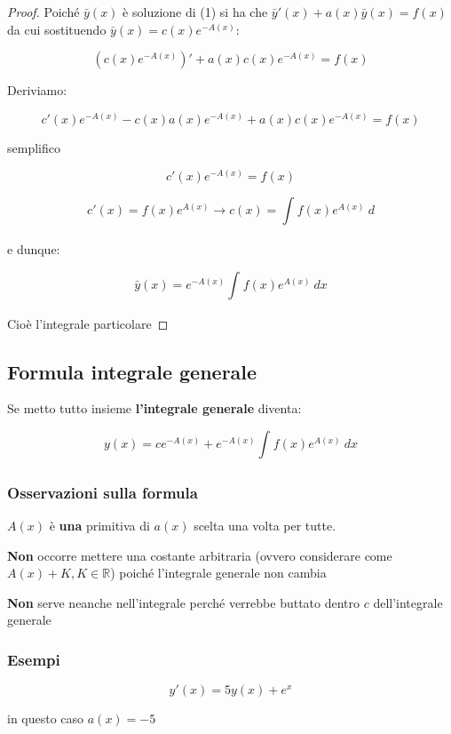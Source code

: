 \documentclass[11pt]{article}
\begin{document}
\begin{proof}
    Poiché $\bar y(x)$ è soluzione di (1) si ha che $\bar y'(x)+a(x) \bar y(x)=f(x)$ da cui sostituendo $\bar y(x) = c(x) e ^{-A(x)}$:

    \[
        (c(x) e ^{-A(x)})'+ a(x) c(x) e ^{-A(x)} = f(x)
    \]
    
    Deriviamo:

    \[
        c'(x) e ^{-A(x)} - c(x) a(x) e ^{-A(x)} + a(x) c(x) e ^{-A(x)}= f(x)
    \]
    
    semplifico

    \[
        c'(x) e ^{-A(x)} = f(x)
    \]

    \[
        c'(x) = f(x) e ^{A(x)} \rightarrow c(x) = \int_{{}}^{{}} {f(x) e ^{A(x)}} \: d{} {}
    \]

    e dunque:

    \[
        \bar y(x) = e ^{-A(x)} \int_{{}}^{{}} {f(x) e ^{A(x)}} \: d{x} {}
    \]

    Cioè l'integrale particolare
\end{proof}

\subsection{Formula integrale generale}

Se metto tutto insieme \textbf{l'integrale generale} diventa:

\[
    y(x) = c e ^{-A(x)} + e ^{-A(x)} \int_{{}}^{{}} {f(x) e ^{A(x)}} \: d{x} {}
\]

\subsubsection{Osservazioni sulla formula}

$A(x)$ è \textbf{una} primitiva di $a(x)$ scelta una volta per tutte.

\textbf{Non} occorre mettere una costante arbitraria (ovvero considerare come $A(x) + K,K \in \mathbb{R}$) poiché l'integrale generale non cambia

\textbf{Non} serve neanche nell'integrale perché verrebbe buttato dentro $c$ dell'integrale generale


\subsubsection{Esempi}

\[
    y'(x) = 5y(x) + e ^{x}
\]

in questo caso $a(x) = -5$
\end{document}
